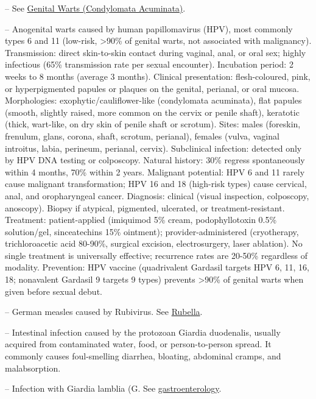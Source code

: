 -- See \hyperlink{Genital Warts (Condylomata Acuminata)}{Genital Warts (Condylomata Acuminata)}.

-- Anogenital warts caused by human papillomavirus (HPV), most commonly types 6 and 11 (low-risk, >90\% of genital warts, not associated with malignancy). Transmission: direct skin-to-skin contact during vaginal, anal, or oral sex; highly infectious (65\% transmission rate per sexual encounter). Incubation period: 2 weeks to 8 months (average 3 months). Clinical presentation: flesh-coloured, pink, or hyperpigmented papules or plaques on the genital, perianal, or oral mucosa. Morphologies: exophytic/cauliflower-like (condylomata acuminata), flat papules (smooth, slightly raised, more common on the cervix or penile shaft), keratotic (thick, wart-like, on dry skin of penile shaft or scrotum). Sites: males (foreskin, frenulum, glans, corona, shaft, scrotum, perianal), females (vulva, vaginal introitus, labia, perineum, perianal, cervix). Subclinical infection: detected only by HPV DNA testing or colposcopy. Natural history: 30\% regress spontaneously within 4 months, 70\% within 2 years. Malignant potential: HPV 6 and 11 rarely cause malignant transformation; HPV 16 and 18 (high-risk types) cause cervical, anal, and oropharyngeal cancer. Diagnosis: clinical (visual inspection, colposcopy, anoscopy). Biopsy if atypical, pigmented, ulcerated, or treatment-resistant. Treatment: patient-applied (imiquimod 5\% cream, podophyllotoxin 0.5\% solution/gel, sinceatechins 15\% ointment); provider-administered (cryotherapy, trichloroacetic acid 80-90\%, surgical excision, electrosurgery, laser ablation). No single treatment is universally effective; recurrence rates are 20-50\% regardless of modality. Prevention: HPV vaccine (quadrivalent Gardasil targets HPV 6, 11, 16, 18; nonavalent Gardasil 9 targets 9 types) prevents >90\% of genital warts when given before sexual debut.

-- German measles caused by Rubivirus. See \hyperlink{Rubella}{Rubella}.

-- Intestinal infection caused by the protozoan Giardia duodenalis, usually acquired from contaminated water, food, or person-to-person spread. It commonly causes foul-smelling diarrhea, bloating, abdominal cramps, and malabsorption.

-- Infection with Giardia lamblia (G. See \hyperlink{Gastroenterology}{gastroenterology}.

